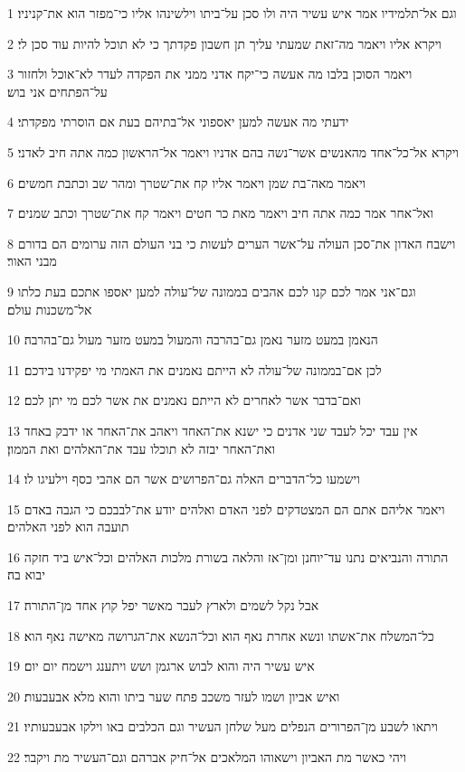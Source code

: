 \par 1 וגם אל־תלמידיו אמר איש עשיר היה ולו סכן על־ביתו וילשינהו אליו כי־מפזר הוא את־קניניו׃
\par 2 ויקרא אליו ויאמר מה־זאת שמעתי עליך תן חשבון פקדתך כי לא תוכל להיות עוד סכן לי׃
\par 3 ויאמר הסוכן בלבו מה אעשה כי־יקח אדני ממני את הפקדה לעדר לא־אוכל ולחזור על־הפתחים אני בוש׃
\par 4 ידעתי מה אעשה למען יאספוני אל־בתיהם בעת אם הוסרתי מפקדתי׃
\par 5 ויקרא אל־כל־אחד מהאנשים אשר־נשה בהם אדניו ויאמר אל־הראשון כמה אתה חיב לאדני׃
\par 6 ויאמר מאה־בת שמן ויאמר אליו קח את־שטרך ומהר שב וכתבת חמשים׃
\par 7 ואל־אחר אמר כמה אתה חיב ויאמר מאת כר חטים ויאמר קח את־שטרך וכתב שמנים׃
\par 8 וישבח האדון את־סכן העולה על־אשר הערים לעשות כי בני העולם הזה ערומים הם בדורם מבני האור׃
\par 9 וגם־אני אמר לכם קנו לכם אהבים בממונה של־עולה למען יאספו אתכם בעת כלתו אל־משכנות עולם׃
\par 10 הנאמן במעט מזער נאמן גם־בהרבה והמעול במעט מזער מעול גם־בהרבה׃
\par 11 לכן אם־בממונה של־עולה לא הייתם נאמנים את האמתי מי יפקידנו בידכם׃
\par 12 ואם־בדבר אשר לאחרים לא הייתם נאמנים את אשר לכם מי יתן לכם׃
\par 13 אין עבד יכל לעבד שני אדנים כי ישנא את־האחד ויאהב את־האחר או ידבק באחד ואת־האחר יבזה לא תוכלו עבד את־האלהים ואת הממון׃
\par 14 וישמעו כל־הדברים האלה גם־הפרושים אשר הם אהבי כסף וילעיגו לו׃
\par 15 ויאמר אליהם אתם הם המצטדקים לפני האדם ואלהים יודע את־לבבכם כי הגבה באדם תועבה הוא לפני האלהים׃
\par 16 התורה והנביאים נתנו עד־יוחנן ומן־אז והלאה בשורת מלכות האלהים וכל־איש ביד חזקה יבוא בה׃
\par 17 אבל נקל לשמים ולארץ לעבר מאשר יפל קוץ אחד מן־התורה׃
\par 18 כל־המשלח את־אשתו ונשא אחרת נאף הוא וכל־הנשא את־הגרושה מאישה נאף הוא׃
\par 19 איש עשיר היה והוא לבוש ארגמן ושש ויתענג וישמח יום יום׃
\par 20 ואיש אביון ושמו לעזר משכב פתח שער ביתו והוא מלא אבעבעות׃
\par 21 ויתאו לשבע מן־הפרורים הנפלים מעל שלחן העשיר וגם הכלבים באו וילקו אבעבעותיו׃
\par 22 ויהי כאשר מת האביון וישאוהו המלאכים אל־חיק אברהם וגם־העשיר מת ויקבר׃
